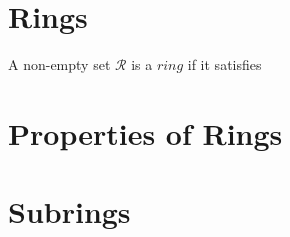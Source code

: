 \section{Rings}

A non-empty set $\mathcal{R}$ is a $\textit{ring}$ if it satisfies 


\section{Properties of Rings}

\section{Subrings}
